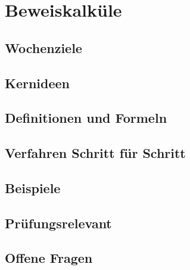 \chapter{Beweiskalküle}
\label{kap:04-beweiskalkuele}

\section*{Wochenziele}
\begin{wochenziele}
\end{wochenziele}

\section{Kernideen}

\section{Definitionen und Formeln}

\section{Verfahren Schritt für Schritt}

\section{Beispiele}

\section{Prüfungsrelevant}

\section{Offene Fragen}
